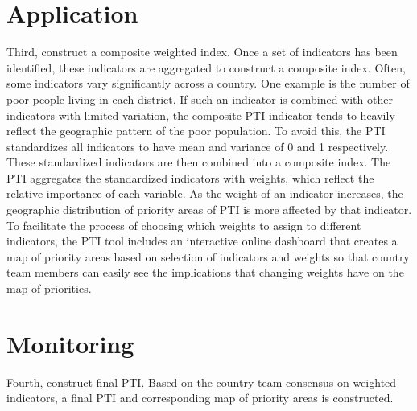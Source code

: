 \documentclass[
]{book}
\begin{document}
\hypertarget{application}{%
\chapter{Application}\label{application}}

Third, construct a composite weighted index. Once a set of indicators has been identified, these indicators are aggregated to construct a composite index. Often, some indicators vary significantly across a country. One example is the number of poor people living in each district. If such an indicator is combined with other indicators with limited variation, the composite PTI indicator tends to heavily reflect the geographic pattern of the poor population. To avoid this, the PTI standardizes all indicators to have mean and variance of 0 and 1 respectively. These standardized indicators are then combined into a composite index. The PTI aggregates the standardized indicators with weights, which reflect the relative importance of each variable. As the weight of an indicator increases, the geographic distribution of priority areas of PTI is more affected by that indicator. To facilitate the process of choosing which weights to assign to different indicators, the PTI tool includes an interactive online dashboard that creates a map of priority areas based on selection of indicators and weights so that country team members can easily see the implications that changing weights have on the map of priorities.

\hypertarget{monitoring}{%
\chapter{Monitoring}\label{monitoring}}

Fourth, construct final PTI. Based on the country team consensus on weighted indicators, a final PTI and corresponding map of priority areas is constructed.

  
\end{document}
